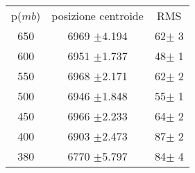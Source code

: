 \begin{center}
\begin{tabulary}{\textwidth}{CCC}
\toprule
p($mb$) &  posizione centroide & RMS \\
650 &6969 $\pm$4.194 &62$\pm$ 3\\
600 &6951 $\pm$1.737 &48$\pm$ 1\\
550 &6968 $\pm$2.171 &62$\pm$ 2\\
500 &6946 $\pm$1.848 &55$\pm$ 1\\
450 &6966 $\pm$2.233 &64$\pm$ 2\\
400 &6903 $\pm$2.473 &87$\pm$ 2\\
380 &6770 $\pm$5.797 &84$\pm$ 4\\
\bottomrule
\end{tabulary}
\end{center}